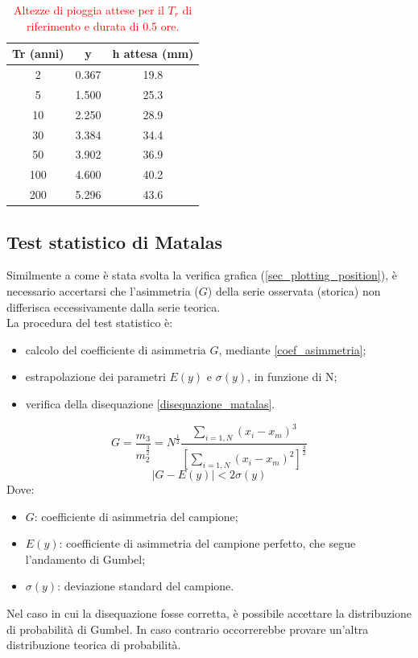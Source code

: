 \begin{table}[H] \centering
    \caption{\textcolor{red}{Altezze di pioggia attese per il $T_r$ di riferimento e durata di 0.5 ore.}}
        \begin{tabular}{ccc}
        \toprule
        Tr (anni) & y     & h attesa (mm) \\
        \midrule
        2 & 0.367 & 19.8  \\
        5 & 1.500 & 25.3  \\
        10  & 2.250 & 28.9          \\
        30  & 3.384 & 34.4          \\
        50  & 3.902 & 36.9          \\
        100 & 4.600 & 40.2          \\
        200 & 5.296 & 43.6          \\         
        \bottomrule
        \end{tabular}
\end{table}
    
\subsection{Test statistico di Matalas}
Similmente a come è stata svolta la verifica grafica (\ref{sec_plotting_position}), è necessario accertarsi che l'asimmetria ($G$) della serie osservata (storica) non differisca eccessivamente dalla serie teorica.\\
La procedura del test statistico è:
\begin{itemize}
\item calcolo del coefficiente di asimmetria $G$, mediante \ref{coef_asimmetria};
\item estrapolazione dei parametri $E(y)$ e $\sigma(y)$, in funzione di N;
\item verifica della disequazione \ref{disequazione_matalas}.
\end{itemize}
\begin{equation}
    G = \frac{m_3}{m_2^{\frac{3}{2}}} = N^{\frac{1}{2}} \frac{\sum_{i=1,N}(x_i - x_m)^3}{\left[\sum_{i=1,N}(x_i-x_m)^2\right]^{\frac{3}{2}}}
    \label{coef_asimmetria}
\end{equation}
\begin{equation}
    |G - E (y)| < 2 \sigma(y)
    \label{disequazione_matalas}
\end{equation}
\noindent Dove:
\begin{itemize}
    \item $G$: coefficiente di asimmetria del campione;
    \item $E(y)$: coefficiente di asimmetria del campione perfetto, che segue l'andamento di Gumbel;
    \item $\sigma (y)$: deviazione standard del campione.
\end{itemize}
Nel caso in cui la disequazione fosse corretta, è possibile accettare la distribuzione di probabilità di Gumbel. In caso contrario occorrerebbe provare un'altra distribuzione teorica di probabilità.

